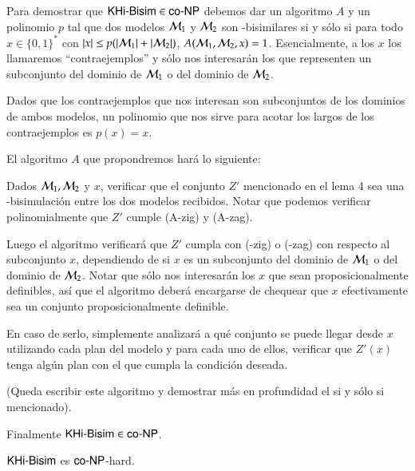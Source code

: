\begin{demostracion}
    Para demostrar que $\rm\textsf{KHi-Bisim} \in \rm\textsf{co-NP}$ debemos dar un algoritmo $A$ y un polinomio $p$ tal que dos modelos $\mathcal{M}_1$ y $\mathcal{M}_2$ son \KHilogic-bisimilares si y sólo si para todo $x \in \{0,1\}^*$ con $|x| \le p(|\mathcal{M}_1|+|\mathcal{M}_2|)$,  $A(\mathcal{M}_1,\mathcal{M}_2,x) = 1$. Esencialmente, a los $x$ los llamaremos ``contraejemplos'' y sólo nos interesarán los que representen un subconjunto del dominio de $\mathcal{M}_1$ o del dominio de $\mathcal{M}_2$.

\medskip\medskip

    Dados que los contraejemplos que nos interesan son subconjuntos de los dominios de ambos modelos, un polinomio que nos sirve para acotar los largos de los contraejemplos es $p(x) = x$. 

\medskip\medskip
    El algoritmo $A$ que propondremos hará lo siguiente:
    
    Dados $\mathcal{M}_1, \mathcal{M}_2$ y $x$, verificar que el conjunto $Z'$ mencionado en el lema 4 sea una \KHilogic-bisimulación entre los dos modelos recibidos. Notar que podemos verificar polinomialmente que $Z'$ cumple (A-zig) y (A-zag).

    Luego el algoritmo verificará que $Z'$ cumpla con (\KHilogic-zig) o (\KHilogic-zag) con respecto al subconjunto $x$,  dependiendo de si $x$ es un subconjunto del dominio de $\mathcal{M}_1$ o del dominio de $\mathcal{M}_2$. Notar que sólo nos interesarán los $x$ que sean proposicionalmente definibles, así que el algoritmo deberá encargarse de chequear que $x$ efectivamente sea un conjunto proposicionalmente definible. 

    En caso de serlo, simplemente analizará a qué conjunto se puede llegar desde $x$ utilizando cada plan del modelo y para cada uno de ellos, verificar que $Z'(x)$ tenga algún plan con el que cumpla la condición deseada. 
    
    (Queda escribir este algoritmo y demostrar más en profundidad el si y sólo si mencionado). 

\medskip\medskip

    Finalmente $\rm\textsf{KHi-Bisim} \in \rm\textsf{co-NP}$.

\end{demostracion}

\begin{lema}
    $\rm\textsf{KHi-Bisim}$ es $\rm\textsf{co-NP}$-hard.
\end{lema}

